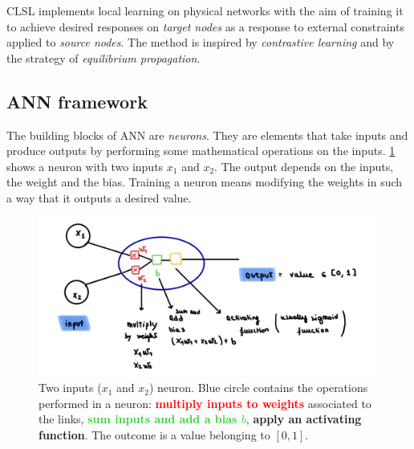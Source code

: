 \documentclass[10.5pt]{article}
\begin{document}
CLSL implements local learning on physical networks with the aim of training it to achieve desired responses on \textit{target nodes} as a response to external constraints applied to \textit{source nodes}. The method is inspired by \textit{contrastive learning} and by the strategy of \textit{equilibrium propagation}. 

\subsection{ANN framework}

The building blocks of ANN are \textit{neurons}. They are elements that take inputs and produce outputs by performing some mathematical operations on the inputs. \cref{fig:neuron} shows a neuron with two inputs $x_1$ and $x_2$. The output depends on the inputs, the weight and the bias. Training a neuron means modifying the weights in such a way that it outputs a desired value.
\begin{figure}[h]
    \centering
    \includegraphics[width=0.75\columnwidth]{../figures_tex/neuron.png}
\caption{Two inputs ($x_1$ and $x_2$) neuron. Blue circle contains the operations performed in a neuron: \textcolor{red}{\textbf{multiply inputs to weights }} associated to the links, \textcolor{LimeGreen}{\textbf{sum inputs and add a bias $b$}}, \textcolor{Dandelion}{\textbf{apply an activating function}}. The outcome is a value belonging to $[0,1]$.}
    \label{fig:neuron}
\end{figure} 
\end{document}
